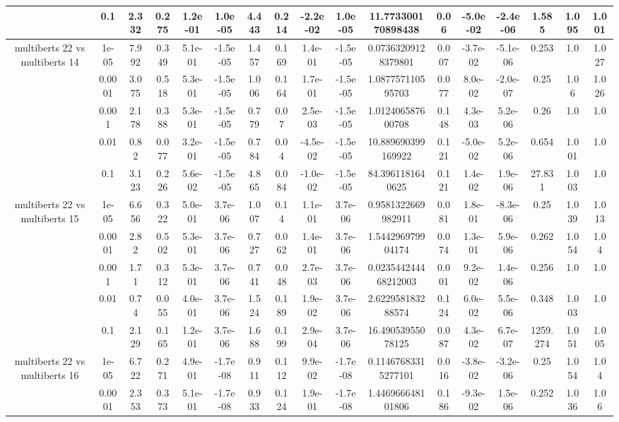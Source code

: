 \begin{tabular}{|c|c|c|c|c|c|c|c|c|c|c|c|c|c|c|c|c|}
 & 0.1 & 2.332 & 0.275 & 1.2e-01 & 1.0e-05 & 4.443 & 0.214 & -2.2e-02 & 1.0e-05 & 11.773300170898438 & 0.06 & -5.0e-02 & -2.4e-06 & 1.585 & 1.095 & 1.001 \\
\hline
\multirow{5}{*}{multiberts 22 vs multiberts 14} & 1e-05 & 7.992 & 0.349 & 5.1e-01 & -1.5e-05 & 1.457 & 0.169 & 1.4e-01 & -1.5e-05 & 0.07363209128379801 & 0.007 & -3.7e-02 & -5.1e-06 & 0.253 & 1.0 & 1.027 \\
 & 0.0001 & 3.075 & 0.518 & 5.3e-01 & -1.5e-05 & 1.006 & 0.164 & 1.7e-01 & -1.5e-05 & 1.087757110595703 & 0.077 & 8.0e-02 & -2.0e-07 & 0.25 & 1.06 & 1.026 \\
 & 0.001 & 2.178 & 0.388 & 5.3e-01 & -1.5e-05 & 0.779 & 0.07 & 2.5e-03 & -1.5e-05 & 1.012406587600708 & 0.148 & 4.3e-03 & 5.2e-06 & 0.26 & 1.0 & 1.0 \\
 & 0.01 & 0.82 & 0.077 & 3.2e-01 & -1.5e-05 & 0.784 & 0.04 & -4.5e-02 & -1.5e-05 & 10.889690399169922 & 0.121 & -5.0e-02 & 5.2e-06 & 0.654 & 1.001 & 1.0 \\
 & 0.1 & 3.123 & 0.226 & 5.6e-02 & -1.5e-05 & 4.865 & 0.084 & -1.0e-02 & -1.5e-05 & 84.3961181640625 & 0.121 & 1.4e-02 & 1.9e-06 & 27.831 & 1.003 & 1.0 \\
\hline
\multirow{5}{*}{multiberts 22 vs multiberts 15} & 1e-05 & 6.656 & 0.322 & 5.0e-01 & 3.7e-06 & 1.007 & 0.14 & 1.1e-01 & 3.7e-06 & 0.9581322669982911 & 0.081 & 1.8e-01 & -8.3e-06 & 0.25 & 1.039 & 1.013 \\
 & 0.0001 & 2.82 & 0.502 & 5.3e-01 & 3.7e-06 & 0.727 & 0.062 & 1.4e-01 & 3.7e-06 & 1.544296979904174 & 0.074 & 1.3e-01 & 5.9e-06 & 0.262 & 1.054 & 1.04 \\
 & 0.001 & 1.71 & 0.312 & 5.3e-01 & 3.7e-06 & 0.741 & 0.048 & 2.7e-03 & 3.7e-06 & 0.023544244468212003 & 0.001 & 9.2e-02 & 1.4e-06 & 0.256 & 1.0 & 1.0 \\
 & 0.01 & 0.74 & 0.055 & 4.0e-01 & 3.7e-06 & 1.524 & 0.189 & 1.9e-02 & 3.7e-06 & 2.622958183288574 & 0.124 & 6.0e-02 & 5.5e-06 & 0.348 & 1.003 & 1.0 \\
 & 0.1 & 2.129 & 0.165 & 1.2e-01 & 3.7e-06 & 1.688 & 0.199 & 2.9e-04 & 3.7e-06 & 16.49053955078125 & 0.087 & 4.3e-02 & 6.7e-07 & 1259.274 & 1.051 & 1.005 \\
\hline
\multirow{5}{*}{multiberts 22 vs multiberts 16} & 1e-05 & 6.722 & 0.271 & 4.9e-01 & -1.7e-08 & 0.911 & 0.112 & 9.9e-02 & -1.7e-08 & 0.11467683315277101 & 0.016 & -3.8e-02 & -3.2e-06 & 0.25 & 1.054 & 1.04 \\
 & 0.0001 & 2.353 & 0.373 & 5.1e-01 & -1.7e-08 & 0.933 & 0.124 & 1.9e-01 & -1.7e-08 & 1.446966648101806 & 0.186 & -9.3e-02 & 1.5e-06 & 0.252 & 1.036 & 1.06 \\

\end{tabular}

